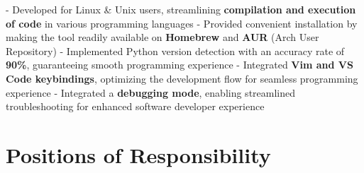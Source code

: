 \documentclass[a4paper,10pt]{extarticle} %
\begin{document}
\begin{description}[style=nextline, font=$\bullet$\hspace{2mm}\normalsize]
 \item[{\href{https://github.com/proffapt/code-runner}{Code Runner}} | Bash, Vim] 
- Developed for Linux \& Unix users, streamlining \textbf{compilation and execution of code} in various programming languages \newline
- Provided convenient installation by making the tool readily available on \textbf{Homebrew} and \textbf{AUR} (Arch User Repository) \newline
- Implemented Python version detection with an accuracy rate of \textbf{90\%}, guaranteeing smooth programming experience \newline
- Integrated \textbf{Vim and VS Code keybindings}, optimizing the development flow for seamless programming experience \newline
- Integrated a \textbf{debugging mode}, enabling streamlined troubleshooting for enhanced software developer experience 
 
\end{description}

\vspace{-0.1cm}
 \section{\textcolor{primary}{Positions of Responsibility}}
\vspace{+0.2cm}
\end{document}
